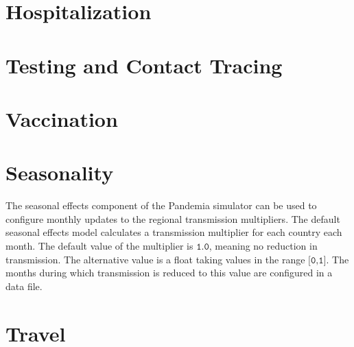 \documentclass[10pt,letterpaper]{article}
\begin{document}
\section{Hospitalization}

\section{Testing and Contact Tracing}

\section{Vaccination}

\section{Seasonality}

The seasonal effects component of the Pandemia simulator can be used to configure monthly updates to the regional transmission multipliers. The default seasonal effects model calculates a transmission multiplier for each country each month. The default value of the multiplier is $\texttt{1.0}$, meaning no reduction in transmission. The alternative value is a float taking values in the range $\texttt{[0,1]}$. The months during which transmission is reduced to this value are configured in a data file.

\section{Travel}
\end{document}

